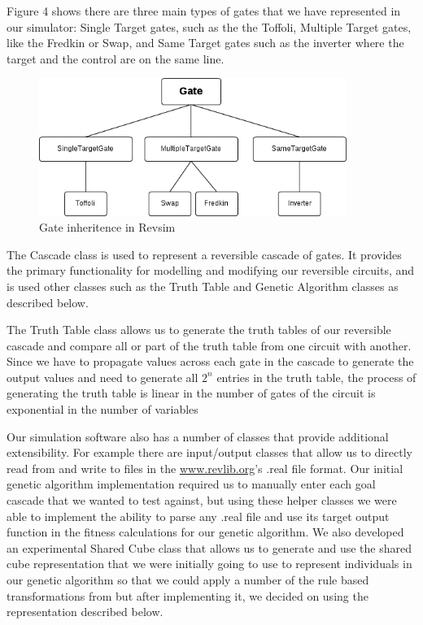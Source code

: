 Figure 4 shows there are three main types of gates that we have represented in our simulator: Single Target 
gates, such as the the Toffoli, Multiple Target gates, like the Fredkin or Swap, and Same Target gates such as the inverter 
where the target and the control are on the same line.

\begin{figure}[ht!]
\centering
\includegraphics[width=100mm]{diagrams/gate_inheritence.png}
\caption{Gate inheritence in Revsim}
\end{figure}
The Cascade class is used to represent a reversible cascade of gates. It provides the primary functionality for modelling 
and modifying our reversible circuits, and is used other classes such as the Truth Table and Genetic Algorithm classes as 
described below.

The Truth Table class allows us to generate the truth tables of our reversible cascade and compare all or part of the truth 
table from one circuit with another. Since we have to propagate values across each gate in the cascade to generate the output 
values and need to generate all \(2^{n}\) entries in the truth table, the process of generating the truth table is linear in the 
number of gates of the circuit is exponential in the number of variables 

Our simulation software also has a number of classes that provide additional extensibility. For example there are input/output 
classes that allow us to directly read from and write to files in the \url{www.revlib.org}'s .real file format. Our initial genetic algorithm implementation 
required us to manually enter each goal cascade that we wanted to test against, but using these helper classes we were able to 
implement the ability to parse any .real file and use its target output function in the fitness calculations for our genetic 
algorithm. We also developed an experimental Shared Cube class that allows us to generate and use the shared cube 
representation that we were initially going to use to represent individuals in our genetic algorithm so that we could apply a 
number of the rule based transformations from \cite{Nayeem2011} but after implementing it, we decided 
on using the representation described below. 

